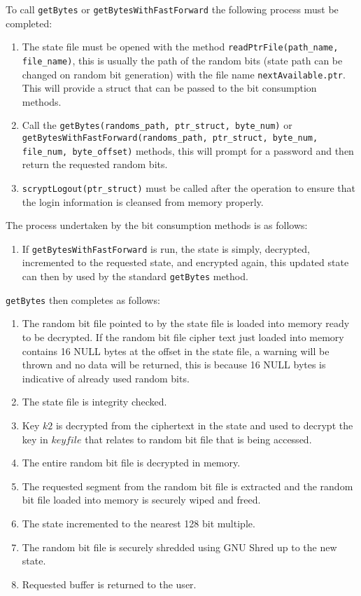 \documentclass{paper}
\begin{document}
					To call \texttt{getBytes} or \texttt{getBytesWithFastForward} the following process must be completed:
					\begin{enumerate}
						\setlength\itemsep{-0.3em}
						\item The state file must be opened with the method \texttt{readPtrFile(path\_name, file\_name)}, this is usually the path of the random bits (state path can be changed on random bit generation) with the file name \texttt{nextAvailable.ptr}. This will provide a struct that can be passed to the bit consumption methods.
						\item Call the \texttt{getBytes(randoms\_path, ptr\_struct, byte\_num)} or \texttt{getBytesWithFastForward(randoms\_path, ptr\_struct, byte\_num, file\_num, byte\_offset)} methods, this will prompt for a password and then return the requested random bits.
						\item \texttt{scryptLogout(ptr\_struct)} must be called after the operation to ensure that the login information is cleansed from memory properly.
					\end{enumerate}
					
					The process undertaken by the bit consumption methods is as follows:
					\begin{enumerate}
						\setlength\itemsep{-0.3em}
						\item If \texttt{getBytesWithFastForward} is run, the state is simply, decrypted, incremented to the requested state, and encrypted again, this updated state can then by used by the standard \texttt{getBytes} method.
					\end{enumerate}
				
					\texttt{getBytes} then completes as follows:
					\begin{enumerate}
						\setlength\itemsep{-0.3em}
						\item The random bit file pointed to by the state file is loaded into memory ready to be decrypted. If the random bit file cipher text just loaded into memory contains 16 NULL bytes at the offset in the state file, a warning will be thrown and no data will be returned, this is because 16 NULL bytes is indicative of already used random bits.
						\item The state file is integrity checked.
						\item Key $\mathit{k2}$ is decrypted from the ciphertext in the state and used to decrypt the key in $\mathit{keyfile}$ that relates to random bit file that is being accessed.
						\item The entire random bit file is decrypted in memory.
						\item The requested segment from the random bit file is extracted and the random bit file loaded into memory is securely wiped and freed.
						\item The state incremented to the nearest 128 bit multiple.
						\item The random bit file is securely shredded using GNU Shred up to the new state.
						\item Requested buffer is returned to the user.
					\end{enumerate}
\end{document}
